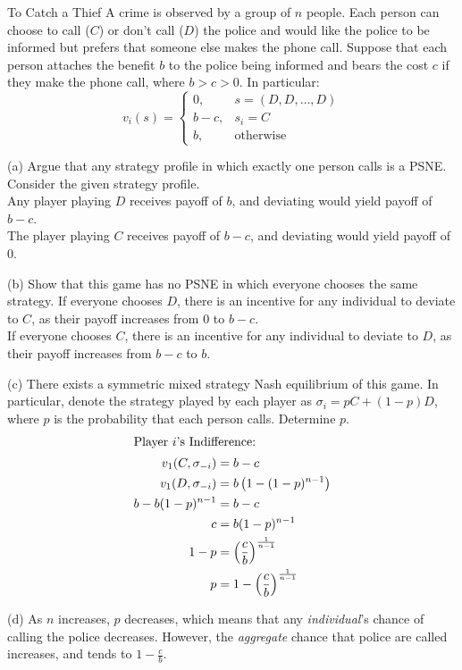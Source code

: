 \documentclass[8pt]{extarticle}
\begin{document}
  \begin{problem}{To Catch a Thief}
    A crime is observed by a group of $n$ people. Each person can choose to call ($C$) or don't call ($D$) the police and would like the police to be informed but prefers that someone else makes the phone call. Suppose that each person attaches the benefit $b$ to the police being informed and bears the cost $c$ if they make the phone call, where $b > c > 0$. In particular:
    \[
      v_i(s) = \begin{cases}
        0,& s = (D,D,\dots,D)\\
        b-c,& s_i = C\\
        b,&\text{otherwise}
      \end{cases}
    \] 
    \tcblower
    \begin{problem}{(a)}
      Argue that any strategy profile in which exactly one person calls is a PSNE.
      \tcblower
      Consider the given strategy profile.\\

      Any player playing $D$ receives payoff of $b$, and deviating would yield payoff of $b-c$.\\

      The player playing $C$ receives payoff of $b-c$, and deviating would yield payoff of $0$.
    \end{problem}
    \begin{problem}{(b)}
      Show that this game has no PSNE in which everyone chooses the same strategy.
      \tcblower
      If everyone chooses $D$, there is an incentive for any individual to deviate to $C$, as their payoff increases from $0$ to $b-c$.\\

      If everyone chooses $C$, there is an incentive for any individual to deviate to $D$, as their payoff increases from $b-c$ to $b$.
    \end{problem}
    \begin{problem}{(c)}
      There exists a symmetric mixed strategy Nash equilibrium of this game. In particular, denote the strategy played by each player as $\sigma_i = pC + (1-p)D$, where $p$ is the probability that each person calls. Determine $p$.
      \tcblower
      \begin{align*}
        \shortintertext{Player $i$'s Indifference:}
        v_1(C,\sigma_{-i}) &= b-c\\
        v_1(D,\sigma_{-i}) &= b\left(1-(1-p)^{n-1}\right)\\
        b-b(1-p)^{n-1} &= b-c \\
        c &= b(1-p)^{n-1}\\
        1-p &= \left(\frac{c}{b}\right)^{\frac{1}{n-1}}\\
        p &= 1-\left(\frac{c}{b}\right)^{\frac{1}{n-1}}
      \end{align*}
    \end{problem}
    \begin{problem}{(d)}
      As $n$ increases, $p$ decreases, which means that any \textit{individual}'s chance of calling the police decreases. However, the \textit{aggregate} chance that police are called increases, and tends to $1-\frac{c}{b}$.
    \end{problem}
  \end{problem}
\end{document}
